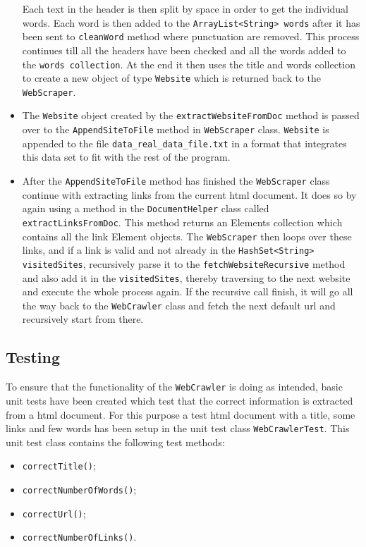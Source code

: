 \begin{itemize}
Each text in the header is then split by space in order to get the individual words. Each word is then added to the {\tt ArrayList<String> words} after it has been sent to {\tt cleanWord} method where punctuation are removed.  This process continues till all the headers have been checked and all the words added to the {\tt words collection}.  At the end it then uses the title and words collection to create a new object of type {\tt Website} which is returned back to the {\tt WebScraper}. 
\item The {\tt Website} object created by the {\tt extractWebsiteFromDoc} method is passed over to the {\tt AppendSiteToFile} method in {\tt WebScraper} class. {\tt Website} is appended to the file {\tt data\_real\_data\_file.txt} in a format that integrates this data set to fit with the rest of the program.
\item After the {\tt AppendSiteToFile} method has finished the {\tt WebScraper} class continue with extracting links from the current html document. It does so by again using a method in the {\tt DocumentHelper} class called {\tt extractLinksFromDoc}. This method returns an Elements collection which contains all the link Element objects. The {\tt WebScraper} then loops over these links, and if a link is valid and not already in the {\tt HashSet<String> visitedSites}, recursively parse it to the {\tt fetchWebsiteRecursive} method and also add it in the {\tt visitedSites}, thereby traversing to the next website and execute the whole process again. If the recursive call finish, it will go all the way back to the {\tt WebCrawler} class and fetch the next default url and recursively start from there.
\end{itemize}

\subsection{Testing}
To ensure that the functionality of the {\tt WebCrawler} is doing as intended, basic unit tests have been created which test that the correct information is extracted from a html document. For this purpose a test html document with a title, some links and few words has been setup in the unit test class {\tt WebCrawlerTest}. This unit test class contains the following test methods:
\begin{itemize}
\item {\tt correctTitle()};
\item {\tt correctNumberOfWords()};
\item {\tt correctUrl()};
\item {\tt correctNumberOfLinks()}.
\end{itemize}

